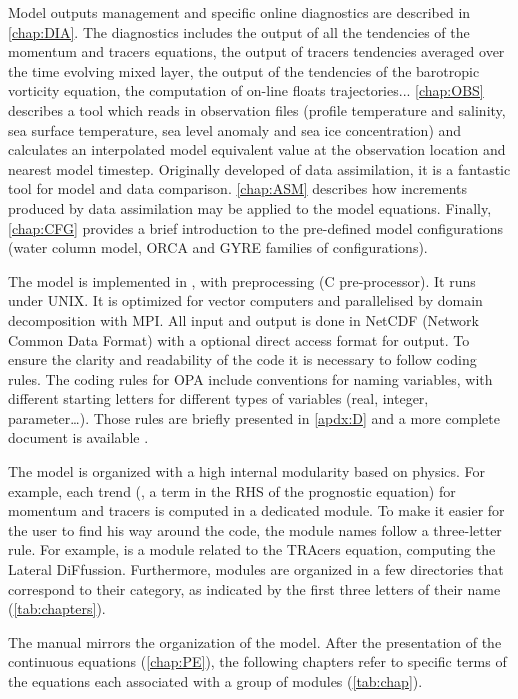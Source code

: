 \documentclass[../main/NEMO_manual]{subfiles}
\begin{document}
Model outputs management and specific online diagnostics are described in \autoref{chap:DIA}.
The diagnostics includes the output of all the tendencies of the momentum and tracers equations,
the output of tracers tendencies averaged over the time evolving mixed layer,
the output of the tendencies of the barotropic vorticity equation,
the computation of on-line floats trajectories...
\autoref{chap:OBS} describes a tool which reads in observation files
(profile temperature and salinity, sea surface temperature, sea level anomaly and sea ice concentration) 
and calculates an interpolated model equivalent value at the observation location and nearest model timestep.
Originally developed of data assimilation, it is a fantastic tool for model and data comparison.
\autoref{chap:ASM} describes how increments produced by data assimilation may be applied to the model equations.
Finally, \autoref{chap:CFG} provides a brief introduction to the pre-defined model configurations
(water column model, ORCA and GYRE families of configurations).

The model is implemented in \fninety, with preprocessing (C pre-processor).
It runs under UNIX.
It is optimized for vector computers and parallelised by domain decomposition with MPI.
All input and output is done in NetCDF (Network Common Data Format) with a optional direct access format for output.
To ensure the clarity and readability of the code it is necessary to follow coding rules.
The coding rules for OPA include conventions for naming variables,
with different starting letters for different types of variables (real, integer, parameter\ldots).
Those rules are briefly presented in \autoref{apdx:D} and a more complete document is available .

The model is organized with a high internal modularity based on physics.
For example, each trend (\ie, a term in the RHS of the prognostic equation) for momentum and tracers
is computed in a dedicated module.
To make it easier for the user to find his way around the code, the module names follow a three-letter rule.
For example,  is a module related to the TRAcers equation, computing the Lateral DiFfussion.
Furthermore, modules are organized in a few directories that correspond to their category,
as indicated by the first three letters of their name (\autoref{tab:chapters}).

The manual mirrors the organization of the model.
After the presentation of the continuous equations (\autoref{chap:PE}),
the following chapters refer to specific terms of the equations each associated with a group of modules 
(\autoref{tab:chap}).
\end{document}
